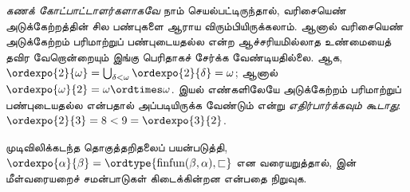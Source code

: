 \documentclass[../../../include/open-logic-section]{subfiles}
\begin{document}
\emph{கணக் கோட்பாட்டாளர்களாகவே} நாம் செயல்பட்டிருந்தால், வரிசையெண்
அடுக்கேற்றத்தின் சில பண்புகளை ஆராய விரும்பியிருக்கலாம். ஆனால்
வரிசையெண் அடுக்கேற்றம் பரிமாற்றுப் பண்புடையதல்ல என்ற
ஆச்சரியமில்லாத உண்மையைத் தவிர வேறொன்றையும் இங்கு பெரிதாகச்
சேர்க்க வேண்டியதில்லை. ஆக,
$\ordexpo{2}{\omega} =
\bigcup_{\delta < \omega}\ordexpo{2}{\delta} = \omega$;
ஆனால் $\ordexpo{\omega}{2} = \omega \ordtimes \omega$.
இயல் எண்களிலேயே அடுக்கேற்றம் பரிமாற்றுப் பண்புடையதல்ல என்பதால்
அப்படியிருக்க வேண்டும் என்று \emph{எதிர்பார்க்கவும் கூடாது}:
$\ordexpo{2}{3} = 8 < 9 = \ordexpo{3}{2}$.

\begin{prob}
முடிவிலிக்கடந்த தொகுத்தறிதலைப் பயன்படுத்தி,
$\ordexpo{\alpha}{\beta} =
\ordtype{\text{finfun}(\beta, \alpha), \sqsubset}$ என
வரையறுத்தால், 
இன் மீள்வரையறைச் சமன்பாடுகள் கிடைக்கின்றன என்பதை நிறுவுக.
\end{prob}
\end{document}
